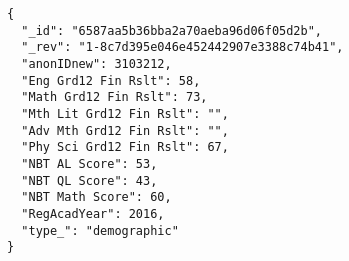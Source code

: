 \begin{verbatim}
{
  "_id": "6587aa5b36bba2a70aeba96d06f05d2b",
  "_rev": "1-8c7d395e046e452442907e3388c74b41",
  "anonIDnew": 3103212,
  "Eng Grd12 Fin Rslt": 58,
  "Math Grd12 Fin Rslt": 73,
  "Mth Lit Grd12 Fin Rslt": "",
  "Adv Mth Grd12 Fin Rslt": "",
  "Phy Sci Grd12 Fin Rslt": 67,
  "NBT AL Score": 53,
  "NBT QL Score": 43,
  "NBT Math Score": 60,
  "RegAcadYear": 2016,
  "type_": "demographic"
}
\end{verbatim}


